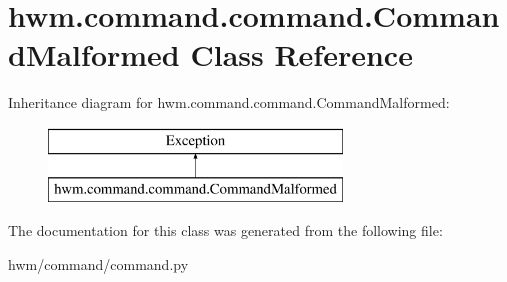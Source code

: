 \hypertarget{classhwm_1_1command_1_1command_1_1_command_malformed}{\section{hwm.\-command.\-command.\-Command\-Malformed Class Reference}
\label{classhwm_1_1command_1_1command_1_1_command_malformed}
}
Inheritance diagram for hwm.\-command.\-command.\-Command\-Malformed\-:\begin{figure}[H]
\begin{center}
\leavevmode
\includegraphics[height=2.000000cm]{classhwm_1_1command_1_1command_1_1_command_malformed}
\end{center}
\end{figure}


The documentation for this class was generated from the following file\-:\begin{DoxyCompactItemize}
\item 
hwm/command/command.\-py\end{DoxyCompactItemize}
